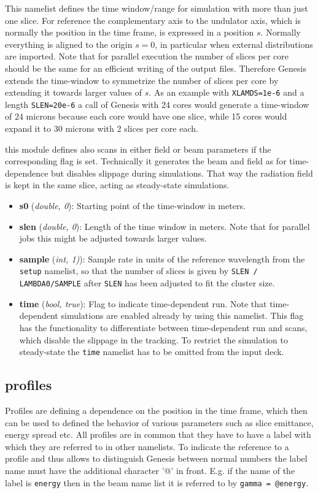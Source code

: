 \documentclass[12pt]{book}
\begin{document}
This namelist defines the time window/range  for simulation with more than just one slice. For reference the complementary axis to the undulator axis, which is normally the position in the time frame, is expressed in a position $s$. Normally everything is aligned to the origin $s=0$, in particular when external distributions are imported. Note that for parallel execution the number of slices per core should be the same for an efficient writing of the output files. Therefore Genesis extends the time-window to symmetrize the number of slices per core by extending it towards larger values of $s$. As an example with {\tt XLAMDS=1e-6} and a length {\tt SLEN=20e-6} a call of Genesis with 24 cores would generate a time-window of 24 microns because each core would have one slice, while 15 cores would expand it to 30 microns with 2 slices per core each.

this module defines also scans in either field or beam parameters if the corresponding flag is set. Technically it generates the beam and field as for time-dependence but disables slippage during simulations. That way the radiation field is kept in the same slice, acting as steady-state simulations.

\begin{itemize}
\item {\bf s0} ({\it double, 0}): Starting point of the time-window in meters.
\item {\bf slen} ({\it double, 0}): Length of the time window in meters. Note that for parallel jobs this might be adjusted towards larger values.
\item {\bf sample} ({\it int, 1)}): Sample rate in units of the reference wavelength from the {\tt setup} namelist, so that the number of slices is given by {\tt SLEN / LAMBDA0/SAMPLE} after {\tt SLEN} has been adjusted to fit the cluster size.
\item{\bf time} ({\it bool, true}): Flag to indicate time-dependent run. Note that time-dependent simulations are enabled already by using this namelist. This flag has the functionality to differentiate between time-dependent run and scans, which disable the slippage in the tracking. To restrict the simulation to steady-state the {\tt time} namelist has to be omitted from the input deck.
\end{itemize}



\subsection{\sf profiles}
Profiles are defining a dependence on the position in the time frame, which then can be used to defined the behavior of various parameters such as slice emittance, energy spread etc. All profiles are in common that they have to have a label with which they are referred to in other namelists. To indicate the reference to a profile and thus allows to distinguish Genesis between normal numbers the label name must have the additional character '@' in front. E.g. if the name of the label is {\tt energy} then in the beam name list it is referred to by {\tt gamma = @energy}.
\end{document}
